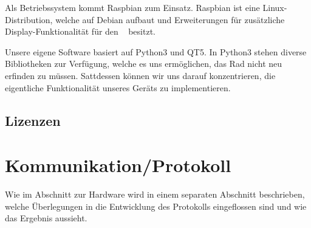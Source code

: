 Als   Betriebssystem   kommt   Raspbian   zum   Einsatz. Raspbian   ist   eine
Linux-Distribution,  welche auf  Debian   aufbaut  und
Erweiterungen f\"ur  zus\"atzliche Display-Funktionalit\"at f\"ur  den \Raspi~
besitzt.

Unsere eigene Software basiert auf  Python3 und QT5. In Python3 stehen diverse
Bibliotheken   zur  Verf\"ugung,  welche  es uns  erm\"oglichen,
das  Rad  nicht   neu  erfinden  zu  m\"ussen. Sattdessen   k\"onnen  wir  uns
darauf  konzentrieren, die  eigentliche Funktionalit\"at  unseres Ger\"ats  zu
implementieren.



\subsection{Lizenzen}
\label{subsec:software:master:licenses}


\section{Kommunikation/Protokoll}
\label{sec:fw:sensorplatine}

Wie im Abschnitt  zur Hardware wird in einem  separaten Abschnitt beschrieben,
welche \"Uberlegungen in die Entwicklung  des Protokolls eingeflossen sind und
wie das Ergebnis aussieht.
